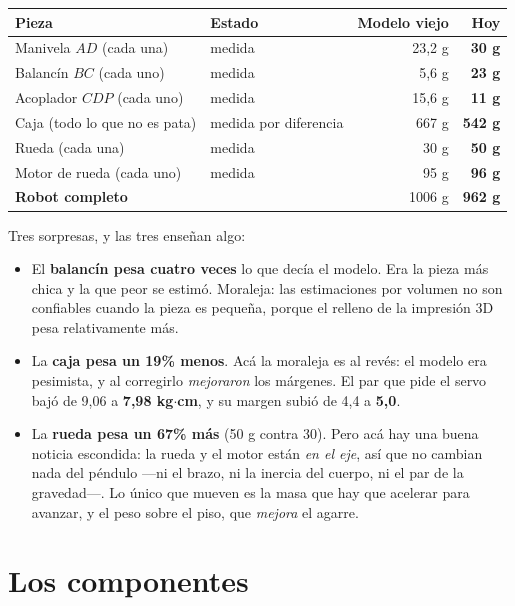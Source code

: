 \documentclass[11pt,a4paper]{report}
\begin{document}
\begin{center}
\begin{tabular}{@{}llrr@{}}
\toprule
\textbf{Pieza} & \textbf{Estado} & \textbf{Modelo viejo} & \textbf{Hoy} \\
\midrule
Manivela $AD$ (cada una) & \textcolor{verdep}{medida} & 23{,}2 g & \textbf{30 g} \\
Balancín $BC$ (cada uno) & \textcolor{verdep}{medida} & 5{,}6 g & \textbf{23 g} \\
Acoplador $CDP$ (cada uno) & \textcolor{verdep}{medida} & 15{,}6 g & \textbf{11 g} \\
Caja (todo lo que no es pata) & \textcolor{verdep}{medida por diferencia} & 667 g & \textbf{542 g} \\
Rueda (cada una) & \textcolor{verdep}{medida} & 30 g & \textbf{50 g} \\
Motor de rueda (cada uno) & \textcolor{verdep}{medida} & 95 g & \textbf{96 g} \\
\midrule
\textbf{Robot completo} & & 1006 g & \textbf{962 g} \\
\bottomrule
\end{tabular}
\end{center}

Tres sorpresas, y las tres enseñan algo:

\begin{itemize}[leftmargin=1.5em]
\item El \textbf{balancín pesa cuatro veces} lo que decía el modelo. Era la pieza más chica y
      la que peor se estimó. Moraleja: las estimaciones por volumen no son confiables cuando
      la pieza es pequeña, porque el relleno de la impresión 3D pesa relativamente más.
\item La \textbf{caja pesa un 19\% menos}. Acá la moraleja es al revés: el modelo era pesimista,
      y al corregirlo \emph{mejoraron} los márgenes. El par que pide el servo bajó de 9{,}06 a
      \textbf{7{,}98 kg$\cdot$cm}, y su margen subió de 4{,}4 a \textbf{5{,}0}.
\item La \textbf{rueda pesa un 67\% más} (50 g contra 30). Pero acá hay una buena noticia
      escondida: la rueda y el motor están \emph{en el eje}, así que no cambian nada del péndulo
      ---ni el brazo, ni la inercia del cuerpo, ni el par de la gravedad---. Lo único que
      mueven es la masa que hay que acelerar para avanzar, y el peso sobre el piso, que
      \emph{mejora} el agarre.
\end{itemize}

\section{Los componentes}
\end{document}
